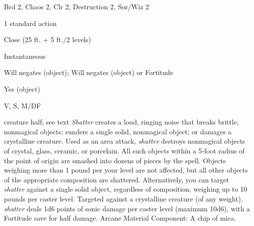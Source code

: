 
\begin{description*}
\item[Level:] Brd 2, Chaos 2, Clr 2, Destruction 2, Sor/Wiz 2
\item[Casting Time:] 1 standard action
\item[Range:] Close (25 ft. + 5 ft./2 levels)
\item[Duration:] Instantaneous
\item[Saving Throw:] Will negates (object); Will negates (object) or Fortitude
\item[Spell Resistance:] Yes (object)
\item[Components:] V, S, M/DF
\end{description*}

creature
half; see text
\textit{Shatter} creates a loud, ringing noise that breaks brittle, nonmagical
objects; sunders a single solid, nonmagical object; or damages a crystalline creature.
Used as an area attack, \textit{shatter} destroys nonmagical objects of crystal,
glass, ceramic, or porcelain. All such objects within a 5-foot radius of the point
of origin are smashed into dozens of pieces by the spell. Objects weighing more
than 1 pound per your level are not affected, but all other objects of the appropriate
composition are shattered.
Alternatively, you can target \textit{shatter} against a single solid object, regardless
of composition, weighing up to 10 pounds per caster level. Targeted against a crystalline
creature (of any weight), \textit{shatter} deals 1d6 points of sonic damage per
caster level (maximum 10d6), with a Fortitude save for half damage.
Arcane Material Component: A chip of mica.